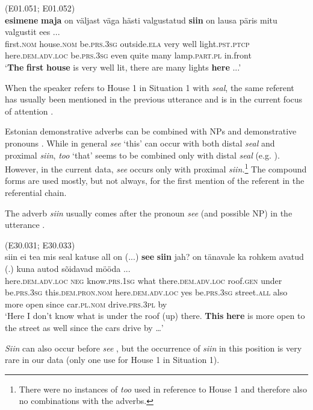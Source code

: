 \documentclass[output=paper,colorlinks,citecolor=brown]{langscibook}
\begin{document}
\ea\label{ex:nahkola:6} (E01.051; E01.052)\\
\gll \textbf{esimene} \textbf{maja} on väljast väga hästi valgustatud \textbf{siin} on lausa päris mitu valgustit ees ...\\
     first.\textsc{nom} house.\textsc{nom} be.\textsc{prs.3sg} outside.\textsc{ela} very well light.\textsc{pst.ptcp} here.\textsc{dem.adv.loc} be.\textsc{prs.3sg} even quite many lamp.\textsc{part.pl} in.front\\
\glt ‘\textbf{The} \textbf{first} \textbf{house} is very well lit, there are many lights \textbf{here} ...’ 
\z

When the speaker refers to House 1 in Situation 1 with \textit{seal}, the same referent has usually been mentioned in the previous utterance and is in the current focus of attention .

Estonian demonstrative adverbs can be combined with NPs and demonstrative pronouns . While in general \textit{see} ‘this’ can occur with both distal \textit{seal} and proximal \textit{siin}, \textit{too} ‘that’ seems to be combined only with distal \textit{seal} (e.g. \citealt{Reile2016}). However, in the current data, \textit{see} occurs only with proximal \textit{siin.}\footnote{There were no instances of \textit{too} used in reference to House 1 and therefore also no combinations with the adverbs.} The compound forms are used mostly, but not always, for the first mention of the referent in the referential chain.

The adverb \textit{siin} usually comes after the pronoun \textit{see} (and possible NP) in the utterance .

\ea\label{ex:nahkola:7} (E30.031; E30.033)\\
\gll siin ei tea mis seal katuse all on (...) \textbf{see} \textbf{siin} jah? on tänavale ka rohkem avatud (.) kuna autod sõidavad mööda ...\\
     here.\textsc{dem.adv.loc} \textsc{neg} know.\textsc{prs}.1\textsc{sg} what there.\textsc{dem.adv.loc} roof.\textsc{gen} under be.\textsc{prs.3sg} {} this.\textsc{dem.pron.nom} here.\textsc{dem.adv.loc} yes be.\textsc{prs.3sg} street.\textsc{all} also more open {} since car.\textsc{pl.nom} drive.\textsc{prs.3pl} by\\
\glt ‘Here I don’t know what is under the roof (up) there. \textbf{This} \textbf{here} is more open to the street as well since the cars drive by …’ 
\z

\textit{Siin} can also occur before \textit{see} , but the occurrence of \textit{siin} in this position is very rare in our data (only one use for House 1 in Situation 1).
\end{document}
